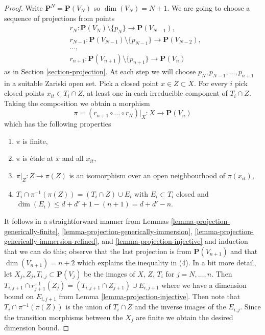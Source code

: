 \begin{proof}
Write $\mathbf{P}^N = \mathbf{P}(V_N)$ so $\dim(V_N) = N + 1$.
We are going to choose a sequence of projections from points
\begin{align*}
& r_N : 
\mathbf{P}(V_N) \setminus \{p_N\} \to \mathbf{P}(V_{N - 1}), \\
& r_{N - 1} :
\mathbf{P}(V_{N - 1}) \setminus \{p_{N - 1}\} \to \mathbf{P}(V_{N - 2}), \\
& \ldots,\\
& r_{n + 1} :
\mathbf{P}(V_{n + 1}) \setminus \{p_{n + 1}\} \to \mathbf{P}(V_n)
\end{align*}
as in Section \ref{section-projection}. At each step we will choose
$p_N, p_{N - 1}, \ldots, p_{n + 1}$ in a suitable Zariski open set.
Pick a closed point $x \in Z \subset X$. For every $i$ pick
closed points $x_{it} \in T_i \cap Z$, at least one in each irreducible
component of $T_i \cap Z$. Taking the composition we obtain
a morphism
$$
\pi = (r_{n + 1} \circ \ldots \circ r_N)|_X :
X \longrightarrow \mathbf{P}(V_n)
$$
which has the following properties
\begin{enumerate}
\item $\pi$ is finite,
\item $\pi$ is \'etale at $x$ and all $x_{it}$,
\item $\pi|_Z : Z \to \pi(Z)$ is an isomorphism
over an open neighbourhood of $\pi(x_{it})$,
\item $T_i \cap \pi^{-1}(\pi(Z)) = (T_i \cap Z) \cup E_i$ with
$E_i \subset T_i$ closed and
$\dim(E_i) \leq d + d' + 1 - (n + 1) = d + d' - n$.
\end{enumerate}
It follows in a straightforward manner from
Lemmas \ref{lemma-projection-generically-finite},
\ref{lemma-projection-generically-immersion},
\ref{lemma-projection-generically-immersion-refined}, and
\ref{lemma-projection-injective} and induction that we can do this;
observe that the last projection is from $\mathbf{P}(V_{n + 1})$ and that
$\dim(V_{n + 1}) = n + 2$ which explains the inequality in (4). In a bit
more detail, let $X_j, Z_j, T_{i, j} \subset \mathbf{P}(V_j)$ be the images
of $X$, $Z$, $T_i$ for $j = N, \ldots, n$. Then
$T_{i, j + 1} \cap r_{j + 1}^{-1}(Z_j) = (T_{i, j + 1} \cap Z_{j + 1})
\cup E_{i, j + 1}$ where we have a dimension bound on $E_{i, j + 1}$
from Lemma \ref{lemma-projection-injective}. Then note that
$T_i \cap \pi^{-1}(\pi(Z))$ is the union of $T_i \cap Z$
and the inverse images of the $E_{i, j}$. Since the transition morphisms
between the $X_j$ are finite we obtain the desired dimension bound.


\end{proof}

